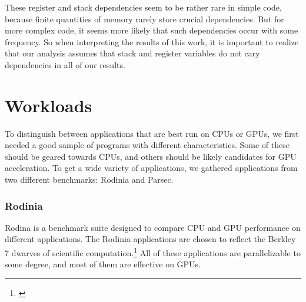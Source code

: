 \documentclass[12pt,twoside]{reedthesis}
\begin{document}
		These register and stack dependencies seem to be rather rare in simple code, because finite quantities of memory rarely store crucial dependencies. But for more complex code, it seems more likely that such dependencies occur with some frequency. So when interpreting the results of this work, it is important to realize that our analysis assumes that stack and register variables do not cary dependencies in all of our results. 
		
%		
%		
%		
%		
		
	\section{Workloads}
		\label{s:workloads}
		
		To distinguish between applications that are best run on CPUs or GPUs, we first needed a good sample of programs with different characteristics. Some of these should be geared towards CPUs, and others should be likely candidates for GPU acceleration. To get a wide variety of applications, we gathered applications from two different benchmarks: Rodinia and Parsec.
		
		\subsubsection{Rodinia}
		
		Rodina is a benchmark suite designed to compare CPU and GPU performance on different applications. The Rodinia applications are chosen to reflect the Berkley 7 dwarves of scientific computation.\footnote{\cite{Che:2009}} All of these applications are parallelizable to some degree, and most of them are effective on GPUs. 
		
\end{document}
